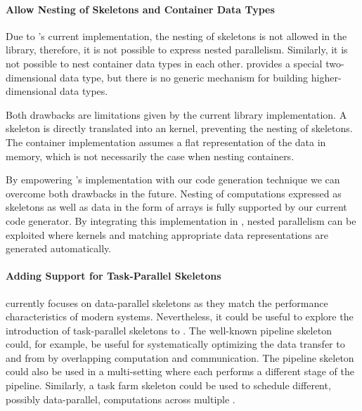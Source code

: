 \paragraph{Allow Nesting of Skeletons and Container Data Types}
Due to \SkelCL's current implementation, the nesting of skeletons is not allowed in the library, therefore, it is not possible to express nested parallelism.
Similarly, it is not possible to nest container data types in each other.
\SkelCL provides a special two-dimensional data type, but there is no generic mechanism for building higher-dimensional data types.

Both drawbacks are limitations given by the current library implementation.
A skeleton is directly translated into an \OpenCL kernel, preventing the nesting of skeletons.
The container implementation assumes a flat representation of the data in memory, which is not necessarily the case when nesting containers.

By empowering \SkelCL's implementation with our code generation technique we can overcome both drawbacks in the future.
Nesting of computations expressed as skeletons as well as data in the form of arrays is fully supported by our current code generator.
By integrating this implementation in \SkelCL, nested parallelism can be exploited where \OpenCL kernels and matching appropriate data representations are generated automatically.

\paragraph{Adding Support for Task-Parallel Skeletons}
\SkelCL currently focuses on data-parallel skeletons as they match the performance characteristics of modern \GPU systems.
Nevertheless, it could be useful to explore the introduction of task-parallel skeletons to \SkelCL.
The well-known pipeline skeleton could, for example, be useful for systematically optimizing the data transfer to and from \GPUs by overlapping computation and communication.
The pipeline skeleton could also be used in a multi-\GPU setting where each \GPU performs a different stage of the pipeline.
Similarly, a task farm skeleton could be used to schedule different, possibly data-parallel, computations across multiple \GPUs.

